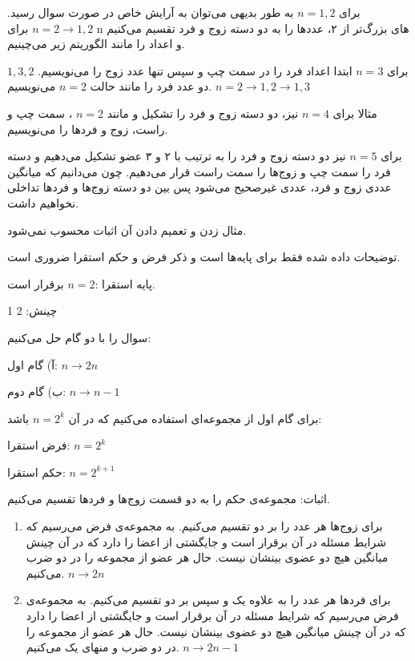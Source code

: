 \documentclass[11pt,largemargins]{h2wp}
\begin{document}
 \solution
 برای $ n= 1 , 2$
 به طور بدیهی می‌توان به آرایش خاص در صورت سوال رسید. 
 $ n = 2 \rightarrow { 1, 2} $
 برای n های بزرگ‌تر از ۲، عددها را به دو دسته زوج و فرد تقسیم می‌کنیم و اعداد را مانند الگوریتم زیر می‌چینیم.
 
 برای $ n=3 $ ابتدا اعداد فرد را در سمت چپ و سپس تنها عدد زوج را می‌نویسیم. 
 $ { 1, 3 ,2 } $
 دو عدد فرد را مانند حالت $ n =2 $ می‌نویسیم.
 $ n=2 \rightarrow { 1 ,2 } \rightarrow { 1 ,3 } $
  
 مثالا برای $ n =4 $ نیز، دو دسته زوج و فرد را تشکیل و مانند $ n =2 $ ، سمت چپ و راست، زوج و فردها را می‌نویسیم.
 
 برای $ n = 5$  نیز دو دسته زوج و فرد را به ترتیب با ۲ و ۳ عضو تشکیل می‌دهیم و دسته فرد را سمت چپ و زوج‌ها را سمت راست قرار می‌دهیم.‌
 چون می‌دانیم که میانگین عددی زوج و فرد، عددی غیرصحیح می‌شود پس بین دو دسته زوج‌ها و فردها تداخلی نخواهیم داشت.
 
 
 \notes
 
 
 مثال زدن و تعمیم دادن آن اثبات محسوب نمی‌شود.
 
 توضیحات داده شده فقط برای پایه‌ها است و ‌ذکر فرض و حکم استقرا ضروری است.
 
 
 
 پایه استقرا :$ n = 2 $  برقرار است.
 
 چینش: 2 1
 
 سوال را با دو گام حل می‌کنیم:
 
 آ) گام اول: $ n  \rightarrow  2n $
 
 ب) گام دوم: $ n \rightarrow n-1 $
 
 برای گام اول از مجموعه‌ای استفاده می‌کنیم که در آن $ n = 2^k $ باشد:
 
 فرض استقرا: $ n = 2^k $ 
 
 حکم استقرا: $n = 2 ^ { k+1 } $ 
 
 
اثبات: مجموعه‌ی حکم را به دو قسمت زوج‌ها و فردها تقسیم می‌کنیم.
	\begin{enumerate}
		\item
برای زوج‌ها هر عدد را بر دو تقسیم می‌کنیم. به مجموعه‌ی فرض می‌رسیم که شرایط مسئله در آن برقرار است و جایگشتی از اعضا را دارد که در آن چینش میانگین هیچ دو عضوی بینشان نیست. حال
 هر عضو از مجموعه را در دو ضرب می‌کنیم.
  $n \rightarrow 2n$

 		\item

برای فردها هر عدد را به علاوه یک و سپس بر دو تقسیم می‌کنیم. به مجموعه‌ی فرض می‌رسیم که شرایط مسئله در آن برقرار است و جایگشتی از اعضا را دارد که در آن چینش میانگین هیچ دو عضوی بینشان نیست.  حال
 هر عضو از مجموعه را در دو ضرب  و منهای یک می‌کنیم.
$n \rightarrow 2n-1$  
 	\end{enumerate}
 	
\end{document}
